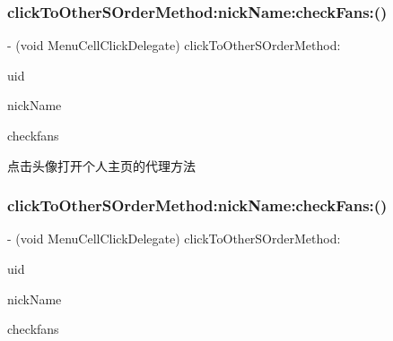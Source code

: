 \subsubsection{\texorpdfstring{click\+To\+Other\+S\+Order\+Method\+:nick\+Name\+:check\+Fans\+:()}{clickToOtherSOrderMethod:nickName:checkFans:()}\hspace{0.1cm}{\footnotesize\ttfamily [2/3]}}
{\footnotesize\ttfamily -\/ (void Menu\+Cell\+Click\+Delegate) click\+To\+Other\+S\+Order\+Method\+: \begin{DoxyParamCaption}\item[{(N\+S\+String $\ast$)}]{uid }\item[{nickName:(N\+S\+String $\ast$)}]{nick\+Name }\item[{checkFans:(N\+S\+Integer)}]{checkfans }\end{DoxyParamCaption}\hspace{0.3cm}{\ttfamily [optional]}}

点击头像打开个人主页的代理方法 \mbox{\label{protocol_menu_cell_click_delegate_01-p_a058ff67514f16b8e96379c8fdf04562a}} 
\subsubsection{\texorpdfstring{click\+To\+Other\+S\+Order\+Method\+:nick\+Name\+:check\+Fans\+:()}{clickToOtherSOrderMethod:nickName:checkFans:()}\hspace{0.1cm}{\footnotesize\ttfamily [3/3]}}
{\footnotesize\ttfamily -\/ (void Menu\+Cell\+Click\+Delegate) click\+To\+Other\+S\+Order\+Method\+: \begin{DoxyParamCaption}\item[{(N\+S\+String $\ast$)}]{uid }\item[{nickName:(N\+S\+String $\ast$)}]{nick\+Name }\item[{checkFans:(N\+S\+Integer)}]{checkfans }\end{DoxyParamCaption}\hspace{0.3cm}{\ttfamily [optional]}}


